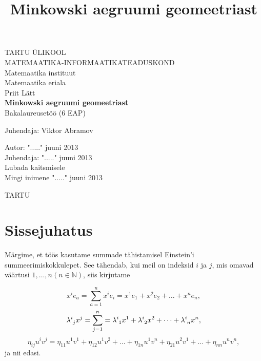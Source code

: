 \documentclass[a4paper,12pt]{article}
\title{Minkowski aegruumi geomeetriast}
\numberwithin{equation}{section}
\begin{document}
\begin{titlepage}
\begin{center}

{\large TARTU ÜLIKOOL}\\[0.3cm]
{\large MATEMAATIKA-INFORMAATIKATEADUSKOND}\\[0.3cm]
{\large Matemaatika instituut}\\[0.3cm]
{\large Matemaatika eriala}\\[3cm]

{\large Priit Lätt}\\[0.3cm]
{\huge \textbf{Minkowski aegruumi geomeetriast}}\\[0.3cm]
{\large Bakalaureusetöö (6 EAP)}\\[3cm]

\begin{flushright}
{\large Juhendaja: Viktor Abramov}
\end{flushright}

\vfill

\begin{flushleft}
{\large
Autor: \dotfill "....." juuni 2013\\
Juhendaja: \dotfill "....." juuni 2013\\[0.5cm]
Lubada kaitsmisele\\
Mingi inimene \dotfill "....." juuni 2013\\[3cm]
}
\end{flushleft}
{\large TARTU \the\year}

\end{center}
\end{titlepage}

\tableofcontents
\newpage

\section{Sissejuhatus}
Märgime, et töös kasutame summade tähistamisel Einstein'i summeerimiskokkulepet. See tähendab, kui meil on indeksid $i$ ja $j$, mis omavad väärtusi $1, \dots, n \left( n \in \mathbb{N} \right)$, siis kirjutame 


\[ x^{i} e_{a} = \sum_{a=1}^{n} x^{i} e_{i} = x^{1} e_{1} + x^{2} e_{2} + \dots + x^{n} e_{n},\]
\[ \lambda\indices{^i_j} x^{j} = \sum_{j=1}^{n} = \lambda\indices{^i_1} x^{1} + \lambda\indices{^i_2} x^{2} + \dots +\lambda\indices{^i_n} x^{n}, \]
\[ \eta_{ij} u^{i} v^{j} = \eta_{11} u^{1} v^{1} + \eta_{12} u^{1} v^{2} + \dots + \eta_{1n} u^{1} v^{n} + \eta_{21} u^{2} v^{1} + \dots + \eta_{nn} u^{n} v^{n}, \]
ja nii edasi.
\end{document}
